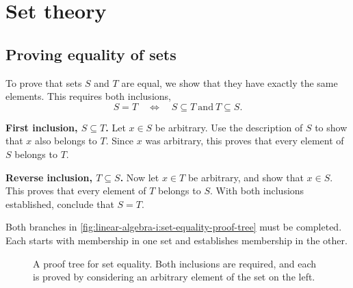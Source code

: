 \section{Set theory}
\label{sec:appendix:set-theory}

\subsection{Proving equality of sets}
\label{sec:linear-algebra-i:set-equality-proofs}

\begin{pendingreview}
To prove that sets \(S\) and \(T\) are equal, we show that they have
exactly the same elements. This requires both inclusions,
\[
  S=T\quad\Longleftrightarrow\quad
  S\subseteq T\ \text{and}\ T\subseteq S.
\]

\textbf{First inclusion, \(S\subseteq T\).}
Let \(x\in S\) be arbitrary. Use the description of \(S\) to show
that \(x\) also belongs to \(T\). Since \(x\) was arbitrary, this
proves that every element of \(S\) belongs to \(T\).

\textbf{Reverse inclusion, \(T\subseteq S\).}
Now let \(x\in T\) be arbitrary, and show that \(x\in S\).
This proves that every element of \(T\) belongs to \(S\). With both
inclusions established, conclude that \(S=T\).

Both branches in \autoref{fig:linear-algebra-i:set-equality-proof-tree}
must be completed. Each starts with membership in one set and establishes
membership in the other.
\end{pendingreview}

\begin{figure}[htbp]
  \centering
  
  \caption[Proving equality by two inclusions]{A proof tree for set
    equality. Both inclusions are required, and each is proved by
    considering an arbitrary element of the set on the left.}
  \label{fig:linear-algebra-i:set-equality-proof-tree}
\end{figure}
